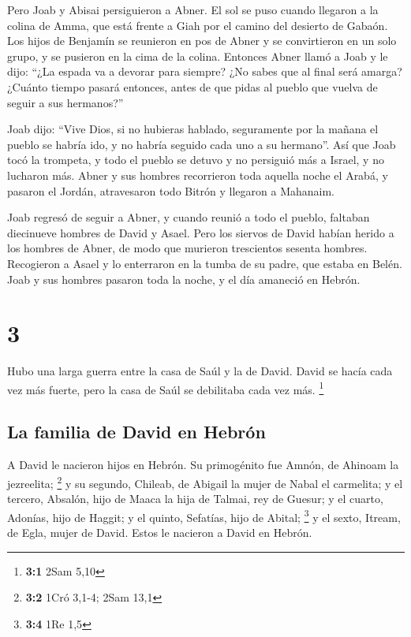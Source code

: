  Pero Joab y Abisai persiguieron a Abner. El sol se puso
cuando llegaron a la colina de Amma, que está frente a Giah por el
camino del desierto de Gabaón.  Los hijos de Benjamín se
reunieron en pos de Abner y se convirtieron en un solo grupo, y se
pusieron en la cima de la colina.  Entonces Abner llamó a
Joab y le dijo: ``¿La espada va a devorar para siempre? ¿No sabes que al
final será amarga? ¿Cuánto tiempo pasará entonces, antes de que pidas al
pueblo que vuelva de seguir a sus hermanos?''

 Joab dijo: ``Vive Dios, si no hubieras hablado,
seguramente por la mañana el pueblo se habría ido, y no habría seguido
cada uno a su hermano''.  Así que Joab tocó la trompeta,
y todo el pueblo se detuvo y no persiguió más a Israel, y no lucharon
más.  Abner y sus hombres recorrieron toda aquella noche
el Arabá, y pasaron el Jordán, atravesaron todo Bitrón y llegaron a
Mahanaim.

 Joab regresó de seguir a Abner, y cuando reunió a todo
el pueblo, faltaban diecinueve hombres de David y Asael. 
Pero los siervos de David habían herido a los hombres de Abner, de modo
que murieron trescientos sesenta hombres.  Recogieron a
Asael y lo enterraron en la tumba de su padre, que estaba en Belén. Joab
y sus hombres pasaron toda la noche, y el día amaneció en Hebrón.

\hypertarget{section-2}{%
\section{3}\label{section-2}}

 Hubo una larga guerra entre la casa de Saúl y la de
David. David se hacía cada vez más fuerte, pero la casa de Saúl se
debilitaba cada vez más. \footnote{\textbf{3:1} 2Sam 5,10}

\hypertarget{la-familia-de-david-en-hebruxf3n}{%
\subsection{La familia de David en
Hebrón}\label{la-familia-de-david-en-hebruxf3n}}

 A David le nacieron hijos en Hebrón. Su primogénito fue
Amnón, de Ahinoam la jezreelita; \footnote{\textbf{3:2} 1Cró 3,1-4; 2Sam
  13,1}  y su segundo, Chileab, de Abigail la mujer de
Nabal el carmelita; y el tercero, Absalón, hijo de Maaca la hija de
Talmai, rey de Guesur;  y el cuarto, Adonías, hijo de
Haggit; y el quinto, Sefatías, hijo de Abital; \footnote{\textbf{3:4}
  1Re 1,5}  y el sexto, Itream, de Egla, mujer de David.
Estos le nacieron a David en Hebrón.


